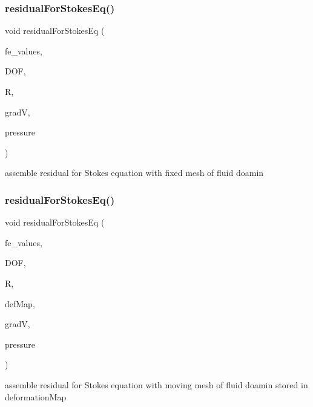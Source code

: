 \subsubsection{\texorpdfstring{residualForStokesEq()}{residualForStokesEq()}\hspace{0.1cm}{\footnotesize\ttfamily [1/2]}}
{\footnotesize\ttfamily void residual\+For\+Stokes\+Eq (\begin{DoxyParamCaption}\item[{const F\+E\+Values$<$ dim $>$ \&}]{fe\+\_\+values,  }\item[{unsigned int}]{D\+OF,  }\item[{Table$<$ 1, T $>$ \&}]{R,  }\item[{Table$<$ 3, T $>$ \&}]{gradV,  }\item[{dealii\+::\+Table$<$ 1, T $>$ \&}]{pressure }\end{DoxyParamCaption})}

assemble residual for Stokes equation with fixed mesh of fluid doamin \mbox{\label{class_residual_a95ad863ab9066d2dbfef9db3907a911f}} 
\subsubsection{\texorpdfstring{residualForStokesEq()}{residualForStokesEq()}\hspace{0.1cm}{\footnotesize\ttfamily [2/2]}}
{\footnotesize\ttfamily void residual\+For\+Stokes\+Eq (\begin{DoxyParamCaption}\item[{const F\+E\+Values$<$ dim $>$ \&}]{fe\+\_\+values,  }\item[{unsigned int}]{D\+OF,  }\item[{Table$<$ 1, T $>$ \&}]{R,  }\item[{\mbox{\hyperlink{structdeformation_map}{deformation\+Map}}$<$ T, dim $>$ \&}]{def\+Map,  }\item[{Table$<$ 3, T $>$ \&}]{gradV,  }\item[{dealii\+::\+Table$<$ 1, T $>$ \&}]{pressure }\end{DoxyParamCaption})}

assemble residual for Stokes equation with moving mesh of fluid doamin stored in deformation\+Map \mbox{\label{class_residual_a339d8e3f5d146ad54951896c5f1e3d19}} 
